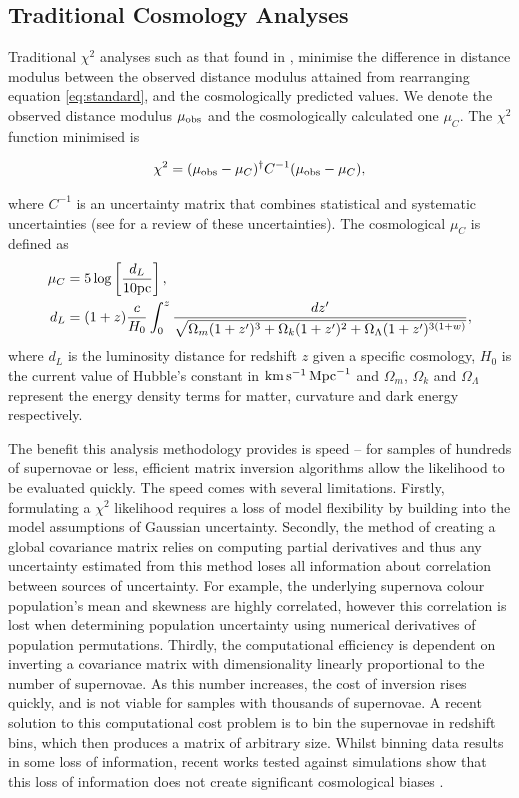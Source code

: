 \documentclass[a4paper,fleqn,usenatbib]{mnras}
\newcommand{\green}{\color{forestgreen}}
\newcommand{\kmsmpc}{{\rm km}\,{\rm s}^{-1}\,{\rm Mpc}^{-1}}
\begin{document}
\subsection{Traditional Cosmology Analyses} \label{sec:traditional}

Traditional $\chi^2$ analyses such as that found in \citet{Riess1998, Perlmutter1999, Wood-Vasey2007, Kowalski2008, Kessler2009, Conley2011, Betoule2014}, minimise the difference in distance modulus between the observed distance modulus attained from rearranging equation \ref{eq:standard}, and the cosmologically predicted values. We denote the observed distance modulus $\mu_{\rm obs}$ and the cosmologically calculated one $\mu_C$. {\green The $\chi^2$ function minimised is}

\begin{align}
\chi^2 = (\mu_{\rm obs} - \mu_C)^\dagger C^{-1} (\mu_{\rm obs} - \mu_C),
\end{align}

where $C^{-1}$ is an uncertainty matrix that combines statistical and systematic uncertainties (see \citet{Betoule2014} for a review of these uncertainties). The cosmological $\mu_C$ is defined as
{\green 
\begin{align}
\mu_C &= 5 \log\left[ \frac{d_L}{10{\rm pc}} \right], \label{eq:mu0}\\
d_L& = (1+z)\frac{c}{H_0} \int_0^z \frac{dz'}{\sqrt{ \Omega_m (1+z')^3 + \Omega_k (1 + z')^2 + \Omega_\Lambda (1+z')^{3(1+w)}}},
\end{align}
}
where $d_L$ is the luminosity distance for redshift $z$ given a specific cosmology, $H_0$ is the current value of Hubble's constant in $\kmsmpc$ and $\Omega_m$, $\Omega_k$ and $\Omega_\Lambda$ represent the energy density terms for matter, curvature and dark energy respectively.

The benefit this analysis methodology provides is speed -- for samples of hundreds of supernovae or less, efficient matrix inversion algorithms allow the likelihood to be evaluated quickly. The speed comes with several limitations. Firstly, formulating a $\chi^2$ likelihood requires a loss of model flexibility by building into the model assumptions of Gaussian uncertainty. Secondly, the method of creating a global covariance matrix relies on computing partial derivatives and thus any uncertainty estimated from this method loses all information about correlation between sources of uncertainty. For example, the underlying supernova colour population's mean and skewness are highly correlated, however this correlation is lost when determining population uncertainty using numerical derivatives of population permutations. Thirdly, the computational efficiency is dependent on inverting a covariance matrix with dimensionality linearly proportional to the number of supernovae. As this number increases, the cost of inversion rises quickly, and is not viable for samples with thousands of supernovae. A recent solution to this computational cost problem is to bin the supernovae {\green in redshift bins}, which then produces a matrix of arbitrary size. Whilst binning data results in some loss of information, recent works tested against simulations show that this loss of information does not create significant cosmological biases \citep{Scolnic2016, Kessler2017}.
\end{document}
